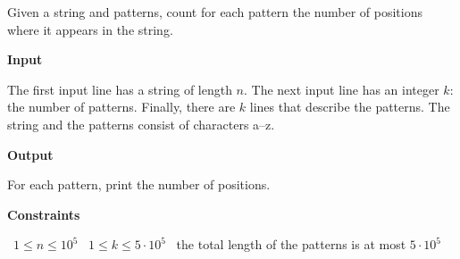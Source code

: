 Given a string and patterns, count for each pattern the number of positions where it appears in the string.

\vspace{0.3cm}\noindent\textbf{Input}

The first input line has a string of length $n$.
The next input line has an integer $k$: the number of patterns. Finally, there are $k$ lines that describe the patterns.
The string and the patterns consist of characters a–z.

\vspace{0.3cm}\noindent\textbf{Output}

For each pattern, print the number of positions.

\vspace{0.3cm}\noindent\textbf{Constraints}

\textbullet\ $1 \le n \le 10^5$
\textbullet\ $1 \le k \le 5 \cdot 10^5$
\textbullet\ the total length of the patterns is at most $5 \cdot 10^5$